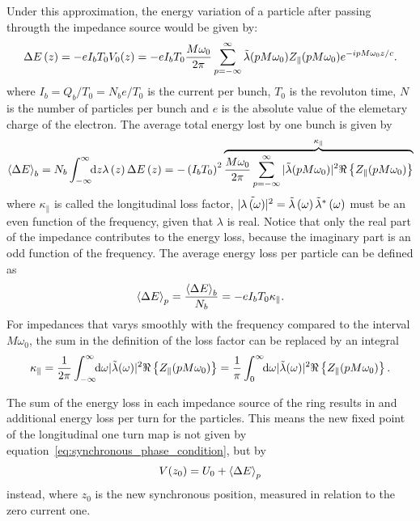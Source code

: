     Under this approximation, the energy variation of a particle after passing througth the impedance source would be given by:
    \begin{align}\label{eq:part_energy_loss}
	  	\Delta E\funcof{z} = -eI_bT_0V_0(z) = -eI_bT_0\frac{M\omega_0}{2\pi} \sum_{p=-\infty}^\infty \fourier{\lambda}(pM\omega_0)Z_\parallel(pM\omega_0)e^{-ipM\omega_0 z/c}.
    \end{align}
    where $I_b=Q_b/T_0=N_be/T_0$ is the current per bunch, $T_0$ is the revoluton time, $N$ is the number of particles per bunch and $e$ is the absolute value of the elemetary charge of the electron. The average total energy lost by one bunch is given by
    \begin{align}
        \average[b]{\Delta E} = N_b\infint{z}{\lambda\funcof{z}\Delta E\funcof{z}} = -\funcof{I_bT_0}^2\overbrace{\frac{M\omega_0}{2\pi} \sum_{p=-\infty}^\infty |\fourier{\lambda}(pM\omega_0)|^2\real{Z_\parallel(pM\omega_0)}}^{\kappa_\parallel}
    \end{align}
    where $\kappa_\parallel$ is called the longitudinal loss factor, $|\fourier{\lambda\funcof{\omega}}|^2 = \fourier{\lambda}\funcof{\omega}\fourier{\lambda}^*\funcof{\omega}$ must be an even function of the frequency, given that $\lambda$ is real. Notice that only the real part of the impedance contributes to the energy loss, because the imaginary part is an odd function of the frequency. The average energy loss per particle can be defined as
    \begin{align}
        \average[p]{\Delta E} = \frac{\average[b]{\Delta E}}{N_b} = -eI_bT_0\kappa_\parallel.
    \end{align}
    For impedances that varys smoothly with the frequency compared to the interval $M\omega_0$, the sum in the definition of the loss factor can be replaced by an integral
    \begin{align}
        \kappa_\parallel =
            \frac{1}{2\pi} \infint{\omega}|\fourier{\lambda}(\omega)|^2\real{Z_\parallel(pM\omega_0)} =
            \frac1\pi \defint{\omega}{|\fourier{\lambda}(\omega)|^2\real{Z_\parallel(pM\omega_0)}}{0}{\infty}.
    \end{align}

    The sum of the energy loss in each impedance source of the ring results in and additional energy loss per turn for the particles. This means the new fixed point of the longitudinal one turn map is not given by equation~\eqref{eq:synchronous_phase_condition}, but by
    \begin{align}
        V(z_0) = U_0 + \average[p]{\Delta E}
    \end{align}
    instead, where $z_0$ is the new synchronous position, measured in relation to the zero current one.

